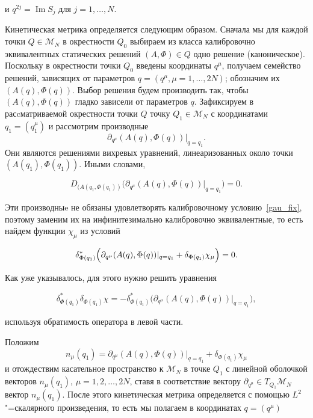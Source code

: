 и $q^{2j}=\mathop{\mathrm {Im}}S_j$ для $j=1,\dots,N$.



Кинетическая метрика определяется следующим образом. Сначала мы для каждой точки $Q\in \mathcal M_N$ в окрестности $Q_0$ выбираем из класса  калибровочно эквивалентных статических решений $(A,\Phi)\in Q$ одно  решение (каноническое). Поскольку в окрестности точки $Q_0$ введены координаты $q^\mu$, получаем семейство решений, зависящих от параметров $q=(q^\mu,\mu=1,\dots, 2N)$; обозначим их $(A(q),\Phi(q))$. Выбор решения будем производить так, чтобы $(A(q),\Phi(q))$ гладко зависели от параметров $q$. Зафиксируем в расcматриваемой окрестности точки $Q$ точку $Q_1\in\mathcal M_N$ с координатами $q_1=(q_1^\mu)$  и рассмотрим производные $$\partial_{q^\mu}(A(q),\Phi(q))|_{q=q_1}.$$ Они являются решениями вихревых уравнений, линеаризованных  около точки $(A(q_1),\Phi(q_1))$. Иными словами, 

$$

D_{(A(q_1,\Phi(q_1))}\bigl(\partial_{q^\mu}(A(q),\Phi(q))|_{q=q_1}\bigr)=0.

$$

Эти производныe не обязаны удовлетворять калибровочному условию~\eqref{gau_fix}, поэтому заменим их на инфинитезимально калибровочно эквивалентные, то есть найдем функции $\chi_\mu$ из условий

$$

\delta^*_{\Phi(q_1)}\Bigl(\partial_{q^\mu}(A(q),\Phi(q))|_{q=q_1}+\delta_{\Phi(q_1)}\chi_\mu\Bigr)=0.

$$

Как уже указывалось, для этого нужно решить уравнения

$$

\delta^*_{\Phi(q_1)}\delta_{\Phi(q_1)}\chi=-\delta^*_{\Phi(q_1)}\bigl(\partial_{q^\mu}(A(q),\Phi(q))|_{q=q_1}\bigr),

$$

используя обратимость оператора в левой части.



Положим $$n_\mu(q_1)=\partial_{q^\mu}(A(q),\Phi(q))|_{q=q_1}+\delta_{\Phi(q_1)}\chi_\mu$$ и отождествим касательное пространство к $\mathcal M_N$ в точке $Q_1$ с линейной оболочкой векторов $n_\mu(q_1)$, $\mu=1, 2,\dots, 2N$, ставя в соответствие вектору \linebreak $\partial_{q^\mu}\in T_{Q_1}\mathcal M_N$ вектор $n_\mu(q_1)$. После этого кинетическая метрика определяется с помощью $L^2$"=скалярного произведения, то есть мы полагаем в координатах $q=(q^\mu)$

